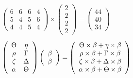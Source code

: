 \documentclass[12pt]{article}
\begin{document}
 
 
\noindent{}
 
 

 
$\left( \begin{array}{ccccccccccccccc}
           6 & 
           6 & 
           6 & 
           4 \\ 
           5 & 
           4 & 
           5 & 
           6 \\ 
           4 & 
           4 & 
           5 & 
           4
\end{array}\right) \times
\left( \begin{array}{c}
           2 \\ 
           2 \\ 
           2 \\ 
           2
\end{array}\right)  =
\left( \begin{array}{c}
          44 \\ 
          40 \\ 
          34
\end{array}\right)  $
 
$  %
 \left( \begin{array}
 {
 c
 c
 }
 \Theta & 
 \eta \\ 
 \rho & 
 \Gamma \\ 
                    \zeta & 
 \Delta \\ 
 \alpha & 
 \Theta
 \end{array} \right)
 \left( \begin{array}
 {
 c
 }
 \beta \\ 
 \beta
 \end{array} \right)
=
  \left( \begin{array}
 {
 c
 }
 \Theta \times  \beta   +  \eta \times  \beta \\ 
 \rho \times  \beta   +  \Gamma \times  \beta \\ 
                    \zeta \times  \beta   +  \Delta \times  \beta \\ 
 \alpha \times  \beta   +  \Theta \times  \beta
 \end{array} \right)
$
 
 
 
\noindent{}
 
 

 
 
 
\noindent{}
 
\end{document}
